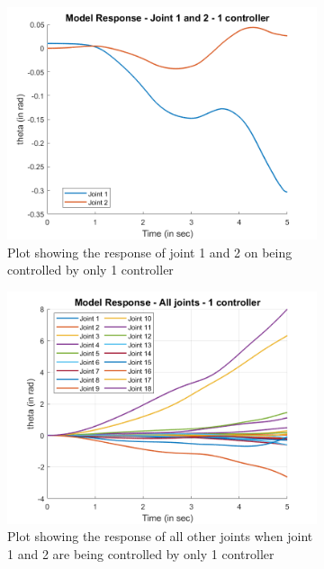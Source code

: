\documentclass[a4paper,12pt]{report}
\begin{document}
\begin{figure}[H]
	\begin{subfigure}{0.5\textwidth}
		\centering
		\includegraphics[width=\linewidth]{images/1-controllers-joint1and2.png}  
		\caption{Plot showing the response of joint 1 and 2 on being controlled by only 1 controller}
	\end{subfigure}
	\begin{subfigure}{0.5\textwidth}
		\centering
		\includegraphics[width=\linewidth]{images/1-controllers-all.png}  
		\caption{Plot showing the response of all other joints when joint 1 and 2 are being controlled by only 1 controller}
	\end{subfigure}
	\begin{subfigure}{0.5\textwidth}

\end{subfigure}
\end{figure}
\end{document}
